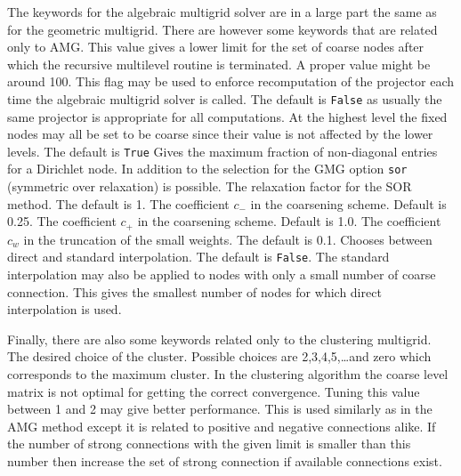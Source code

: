The keywords for the algebraic multigrid solver are in a large part the same as
for the geometric multigrid. There are however some keywords that are related only to AMG.
\sifbegin
{}
This value gives a lower limit for the set of coarse nodes after which
the recursive multilevel routine is terminated. A proper value 
might be around 100.
This flag may be used to enforce recomputation of the projector 
each time the algebraic multigrid solver is called. The default is
\texttt{False} as usually the same projector is appropriate for all
computations.
At the highest level the fixed nodes may all be set
to be coarse since their value is not affected by the lower levels.
The default is \texttt{True}
Gives the maximum fraction of non-diagonal entries for a Dirichlet node.
In addition to the selection for the GMG option \texttt{sor} (symmetric over relaxation)
is possible. 
The relaxation factor for the SOR method. The default is 1.
The coefficient $c_{-}$ in the coarsening scheme. Default is 0.25.
The coefficient $c_{+}$ in the coarsening scheme. Default is 1.0.
The coefficient $c_w$ in the truncation of the small weights. The default is 0.1.
Chooses between direct and standard interpolation. The default is \texttt{False}.
The standard interpolation may also be applied to nodes with 
only a small number of coarse connection. This gives the smallest number
of nodes for which direct interpolation is used.
\sifend

Finally, there are also some keywords related only to the clustering multigrid.
\sifbegin
   The desired choice of the cluster. Possible choices are 2,3,4,5,\ldots and zero which
  corresponds to the maximum cluster.
   In the clustering algorithm the coarse level matrix is not optimal for getting 
   the correct convergence. Tuning this value between 1 and 2 may give better performance.
  This is used similarly as in the AMG method except it is related to positive and negative
  connections alike.
  If the number of strong connections with the given limit is smaller than this number
  then increase the set of strong connection if available connections exist.
\sifend



